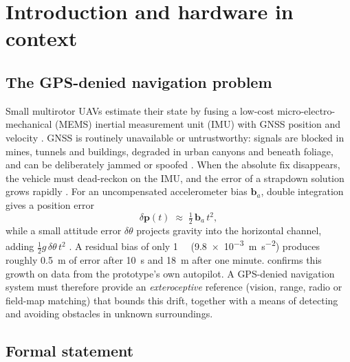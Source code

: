 \section{Introduction and hardware in context}
\label{sec:intro}

\subsection{The GPS-denied navigation problem}

Small multirotor UAVs estimate their state by fusing a low-cost micro-electro-mechanical
(MEMS) inertial measurement unit (IMU) with GNSS position and velocity
\cite{groves2013principles}. GNSS is routinely unavailable or untrustworthy: signals
are blocked in mines, tunnels and buildings, degraded in urban canyons and beneath
foliage, and can be deliberately jammed or spoofed \cite{humphreys2008spoofing}.
When the absolute fix disappears, the vehicle must dead-reckon on the IMU, and the
error of a strapdown solution grows rapidly \cite{titterton2004strapdown}. For an
uncompensated accelerometer bias $\mathbf{b}_a$, double integration gives a position
error
\begin{equation}
  \delta\mathbf{p}(t) \;\approx\; \tfrac{1}{2}\,\mathbf{b}_a\,t^{2},
  \label{eq:bias-drift}
\end{equation}
while a small attitude error $\delta\theta$ projects gravity into the horizontal
channel, adding $\tfrac12 g\,\delta\theta\,t^2$ \cite{titterton2004strapdown}. A residual bias of
only \SI{1}{\milli\gacc} (\SI{9.8e-3}{\metre\per\second\squared}) produces roughly
\SI{0.5}{\metre} of error after \SI{10}{\second} and \SI{18}{\metre} after one minute.  confirms this growth on data
from the prototype's own autopilot. A GPS-denied navigation system must therefore
provide an \emph{exteroceptive} reference (vision, range, radio or field-map matching)
that bounds this drift, together with a means of detecting and avoiding obstacles in
unknown surroundings.

\subsection{Formal statement}


